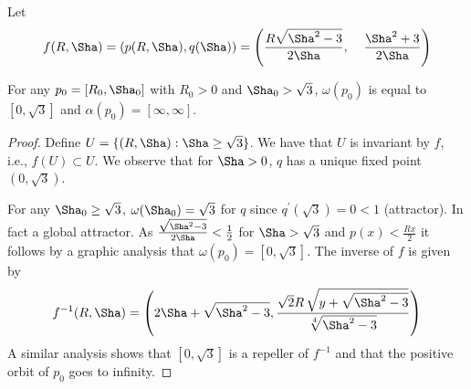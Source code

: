 \begin{proposition}[Convergence]
Let \[ f(R,\Sha)=  (p(R,\Sha),q(\Sha))=\left(  \frac{R\sqrt{\Sha^2-3}}{2\Sha},\;\;\;\;
  \frac{\Sha^2+3}{2\Sha}\right) \]
  
  For any $p_0=[R_0,\Sha_0]$ with $R_0>0$ and $\Sha_0>\sqrt{3} $,  $\omega(p_0)$ is equal to
  $[0,\sqrt{3}]$ and $\alpha(p_0)=[\infty,\infty].$
 \label{prop:conjunto_limite}
\end{proposition}
\begin{proof}
Define $U=\{(R,\Sha) : \Sha\geq \sqrt{3}\}$. We have that $U$ is invariant by $f$, i.e., $f(U)\subset U.$
We observe that for $\Sha>0$,    $q$ has a unique fixed point $(0,\sqrt{3})$.  
 
For any $\Sha_0\geq \sqrt{3}$, $\omega(\Sha_0)=\sqrt{3}$ for $q$ since $q^\prime(\sqrt{3})=0<1$ (attractor). In fact a global attractor. As $\frac{\sqrt{\Sha^2-3}}{2\Sha}<\frac{1}{2}$    for $\Sha>\sqrt{3}$ and $p(x)< \frac{Rx}{2}$ it follows by a graphic analysis that  $\omega( p_0)=[0,\sqrt{3}]$.
 The inverse of $f$ is given by
 \[ f^{-1}(R,\Sha)=\left(2\Sha+\sqrt{\Sha^2-3}, {\frac {\sqrt {2}R\,\sqrt {y+\sqrt {\Sha^{2}-3}}}{\sqrt [4]{\Sha^{2}-3}}}\right)\]
A similar analysis shows that $[0,\sqrt{3}] $ is a repeller of $f^{-1}$ and that the positive orbit of $p_0$ goes to infinity.
 \end{proof}
 

